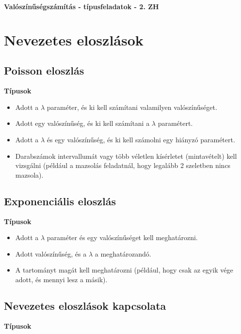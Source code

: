 \documentclass[a4paper]{article}
\begin{document}
\begin{center}
   \large \textbf{Valószínűségszámítás - típusfeladatok - 2. ZH}
\end{center}

\vskip 1cm

\section{Nevezetes eloszlások}

\subsection{Poisson eloszlás}

\noindent \textbf{Típusok}

\begin{itemize}
\item Adott a $\lambda$ paraméter, és ki kell számítani valamilyen valószínűséget.
\item Adott egy valószínűség, és ki kell számítani a $\lambda$ paramétert.
\item Adott a $\lambda$ és egy valószínűség, és ki kell számolni egy hiányzó paramétert.
\item Darabszámok intervallumát vagy több véletlen kísérletet (mintavételt) kell vizsgálni (például a mazsolás feladatnál, hogy legalább 2 szeletben nincs mazsola).
\end{itemize}

\subsection{Exponenciális eloszlás}

\noindent \textbf{Típusok}

\begin{itemize}
\item Adott a $\lambda$ paraméter és egy valószínűséget kell meghatározni.
\item Adott valószínűség, és a $\lambda$ a meghatározandó.
\item A tartományt magát kell meghatározni (például, hogy csak az egyik vége adott, és mennyi lesz a másik).
\end{itemize}

\subsection{Nevezetes eloszlások kapcsolata}

\textbf{Típusok}
\end{document}

